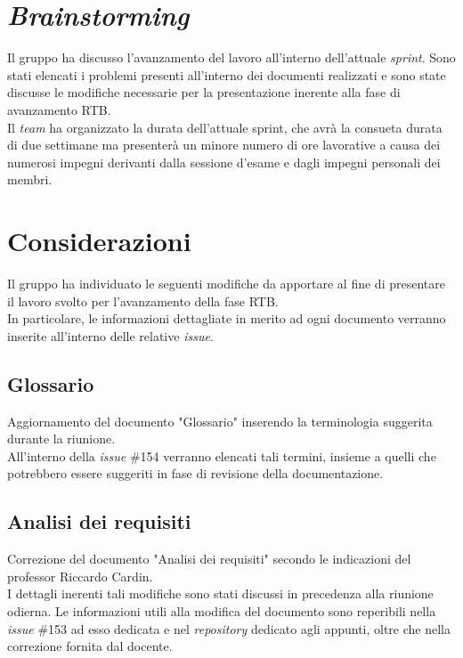 \section{\textit{Brainstorming}}
Il gruppo ha discusso l'avanzamento del lavoro all'interno dell'attuale \textit{sprint}.
Sono stati elencati i problemi presenti all'interno dei documenti realizzati e sono state discusse le modifiche necessarie per la presentazione inerente alla fase di avanzamento RTB.\\

Il \textit{team} ha organizzato la durata dell'attuale sprint, che avrà la consueta durata di due settimane ma presenterà un minore numero di ore lavorative a causa dei numerosi impegni derivanti dalla sessione d'esame e dagli impegni personali dei membri.

\section{Considerazioni}
Il gruppo ha individuato le seguenti modifiche da apportare al fine di presentare il lavoro svolto per l'avanzamento della fase RTB.\\
In particolare, le informazioni dettagliate in merito ad ogni documento verranno inserite all'interno delle relative \textit{issue}.

\subsection{Glossario}
Aggiornamento del documento "Glossario" inserendo la terminologia suggerita durante la riunione.\\
All'interno della \textit{issue} \#154 verranno elencati tali termini, insieme a quelli che potrebbero essere suggeriti in fase di revisione della documentazione.

\subsection{Analisi dei requisiti}
Correzione del documento "Analisi dei requisiti" secondo le indicazioni del professor Riccardo Cardin. \\
I dettagli inerenti tali modifiche sono stati discussi in precedenza alla riunione odierna.
Le informazioni utili alla modifica del documento sono reperibili nella \textit{issue} \#153 ad esso dedicata e nel \textit{repository} dedicato agli appunti, oltre che nella correzione fornita dal docente.

